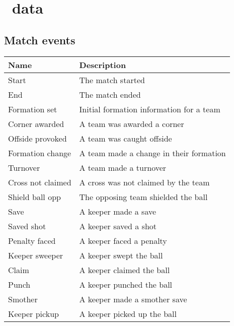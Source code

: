 \chapter{\whoscoredplain\ data}
\label{chp:whoscored-data-description}


\section{Match events}

\begin{table}
    \centering
    \noindent\begin{tabulary}{\textwidth}{| L | L |}
        \hline
        \textbf{Name}       & \textbf{Description} \\\hline
        Start               & The match started \\\hline
        End                 & The match ended \\\hline
        Formation set       & Initial formation information for a team \\\hline
        
        Corner awarded      & A team was awarded a corner \\\hline
        Offside provoked    & A team was caught offside \\\hline
        Formation change    & A team made a change in their formation \\\hline
        Turnover            & A team made a turnover \\\hline
        Cross not claimed   & A cross was not claimed by the team \\\hline
        Shield ball opp     & The opposing team shielded the ball \\\hline
        
        Save                & A keeper made a save \\\hline
        Saved shot          & A keeper saved a shot \\\hline
        Penalty faced       & A keeper faced a penalty \\\hline
        Keeper sweeper      & A keeper swept the ball \\\hline
        Claim               & A keeper claimed the ball \\\hline
        Punch               & A keeper punched the ball \\\hline
        Smother             & A keeper made a smother save \\\hline
        Keeper pickup       & A keeper picked up the ball \\\hline
        

\end{tabulary}
\end{table}
